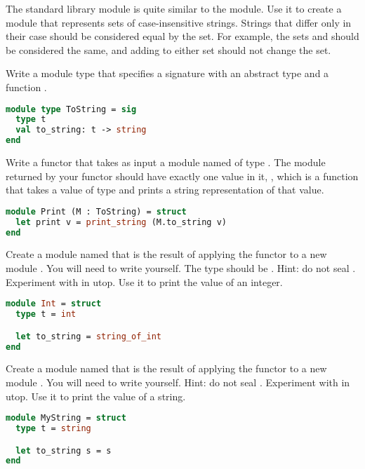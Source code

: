 \problem[sets]
The standard library  module is quite similar to the  module. Use it to create a module that represents sets of case-insensitive strings. Strings that differ only in their case should be considered equal by the set. For example, the sets  and  should be considered the same, and adding  to either set should not change the set.

\problem[ToString]
Write a module type  that specifies a signature with an abstract type  and a function .

\begin{lstlisting}[language=OCaml]
module type ToString = sig
  type t
  val to_string: t -> string
end
\end{lstlisting}

\problem[Print]
Write a functor  that takes as input a module named  of type . The module returned by your functor should have exactly one value in it, , which is a function that takes a value of type  and prints a string representation of that value.

\begin{lstlisting}[language=OCaml]
module Print (M : ToString) = struct
  let print v = print_string (M.to_string v)
end
\end{lstlisting}

Create a module named  that is the result of applying the functor  to a new module . You will need to write  yourself. The type  should be . Hint: do not seal .
Experiment with  in utop. Use it to print the value of an integer.

\begin{lstlisting}[language=OCaml]
module Int = struct
  type t = int

  let to_string = string_of_int
end
\end{lstlisting}

Create a module named  that is the result of applying the functor  to a new module . You will need to write  yourself. Hint: do not seal .
Experiment with  in utop. Use it to print the value of a string.

\begin{lstlisting}[language=OCaml]
module MyString = struct
  type t = string

  let to_string s = s
end
\end{lstlisting}

